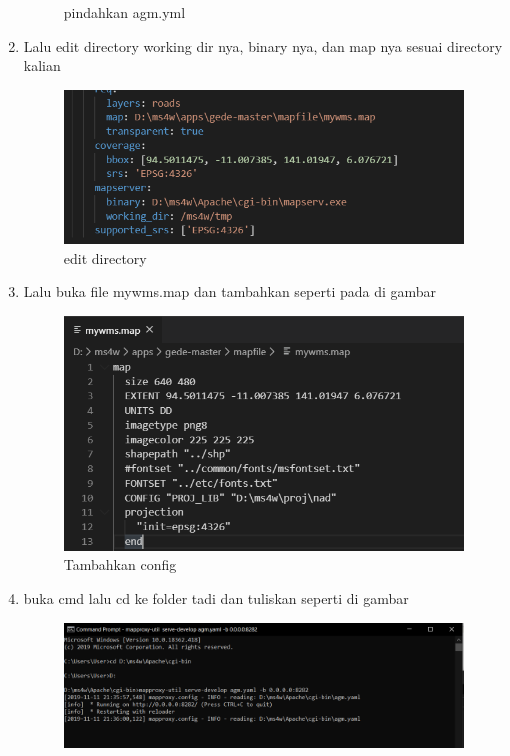 \begin{enumerate}
\begin{figure}[H]
		\centering
		\caption{pindahkan agm.yml}
	\end{figure}
    \item Lalu edit directory working dir nya, binary nya, dan map nya sesuai directory kalian
    \hfill\break
    \begin{figure}[H]
		\includegraphics[width=12cm]{figures/1174040/Python3/9.PNG}
		\centering
		\caption{edit directory}
	\end{figure}
	\item Lalu buka file mywms.map dan tambahkan seperti pada di gambar
	\hfill\break
    \begin{figure}[H]
		\includegraphics[width=12cm]{figures/1174040/Python3/tambahpenting.PNG}
		\centering
		\caption{Tambahkan config}
	\end{figure}
    \item buka cmd lalu cd ke folder tadi dan tuliskan seperti di gambar
    \hfill\break
    \begin{figure}[H]
		\includegraphics[width=12cm]{figures/1174040/Python3/10.PNG}

\end{figure}
\end{enumerate}
